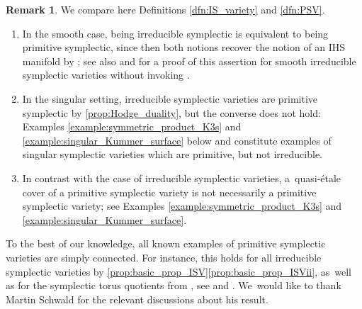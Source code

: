 \documentclass[10pt]{amsart}
\theoremstyle{plain}
\theoremstyle{definition}
\newtheorem{rem}[thm]{Remark}
\begin{document}
\begin{rem}
\label{rem:irreducible_vs_primitive_symplectic}
We compare here Definitions \ref{dfn:IS_variety} and \ref{dfn:PSV}.
\begin{enumerate}
\item\label{rem:irreducible_vs_primitive_symplectici}
In the smooth case, being irreducible symplectic is equivalent to being primitive symplectic, since then both notions recover the notion of an IHS manifold by \cite[Th.\,1]{Schwald22}; see also \cite[Rem.\,8.19]{GKP16b} and \cite[Rem.\,2]{Schwald22} for a proof of this assertion for smooth irreducible symplectic varieties without invoking \cite[Th.\,1]{Schwald22}.

\item\label{rem:irreducible_vs_primitive_symplecticii}
In the singular setting, irreducible symplectic varieties are primitive symplectic by \autoref{prop:Hodge_duality}, but the converse does not hold: Examples \ref{example:symmetric_product_K3s} and \ref{example:singular_Kummer_surface} below and \cite[Ex.\,26]{Schwald20} constitute examples of singular symplectic varieties which are primitive, but not irreducible.

\item\label{rem:irreducible_vs_primitive_symplecticiii}
In contrast with the case of irreducible symplectic varieties, a~quasi-étale cover of a primitive symplectic variety is not necessarily a primitive symplectic variety; see Examples \ref{example:symmetric_product_K3s} and \ref{example:singular_Kummer_surface}.
\end{enumerate}
\end{rem}

To the best of our knowledge, all known examples of primitive symplectic varieties are simply connected. For instance, this holds for all irreducible symplectic varieties by \autoref{prop:basic_prop_ISV}\eqref{prop:basic_prop_ISVii}, as~well as for the symplectic torus quotients from \cite[Lem.\,5]{Schwald22}, see \cite[Lem.\,1.2]{Fujiki83b} and \cite[\S 6]{Schwald22}. We~would like to thank Martin Schwald for the relevant discussions about his result.
\end{document}

